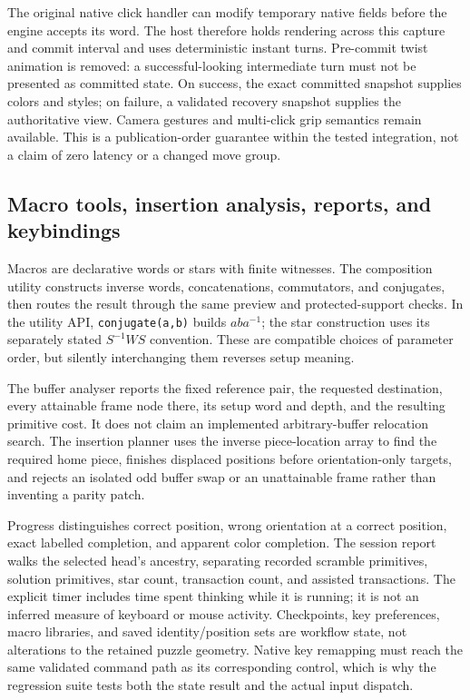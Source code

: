 \documentclass[a4paper,11pt]{article}
\begin{document}
The original native click handler can modify temporary native fields before the engine accepts its word. The host therefore holds rendering across this capture and commit interval and uses deterministic instant turns. Pre-commit twist animation is removed: a successful-looking intermediate turn must not be presented as committed state. On success, the exact committed snapshot supplies colors and styles; on failure, a validated recovery snapshot supplies the authoritative view. Camera gestures and multi-click grip semantics remain available. This is a publication-order guarantee within the tested integration, not a claim of zero latency or a changed move group.

\subsection{Macro tools, insertion analysis, reports, and keybindings}

Macros are declarative words or stars with finite witnesses. The composition utility constructs inverse words, concatenations, commutators, and conjugates, then routes the result through the same preview and protected-support checks. In the utility API, \texttt{conjugate(a,b)} builds \(aba^{-1}\); the star construction uses its separately stated \(S^{-1}WS\) convention. These are compatible choices of parameter order, but silently interchanging them reverses setup meaning.

The buffer analyser reports the fixed reference pair, the requested destination, every attainable frame node there, its setup word and depth, and the resulting primitive cost. It does not claim an implemented arbitrary-buffer relocation search. The insertion planner uses the inverse piece-location array to find the required home piece, finishes displaced positions before orientation-only targets, and rejects an isolated odd buffer swap or an unattainable frame rather than inventing a parity patch.

Progress distinguishes correct position, wrong orientation at a correct position, exact labelled completion, and apparent color completion. The session report walks the selected head's ancestry, separating recorded scramble primitives, solution primitives, star count, transaction count, and assisted transactions. The explicit timer includes time spent thinking while it is running; it is not an inferred measure of keyboard or mouse activity. Checkpoints, key preferences, macro libraries, and saved identity/position sets are workflow state, not alterations to the retained puzzle geometry. Native key remapping must reach the same validated command path as its corresponding control, which is why the regression suite tests both the state result and the actual input dispatch.
\end{document}

